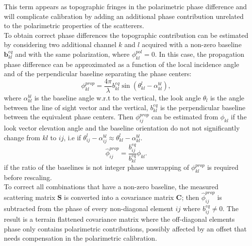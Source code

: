 This term appears as topographic fringes in the polarimetric phase difference and will complicate calibration by adding an additional phase contribution unrelated to the polarimetric properties of the scatterers.\\
To obtain correct phase differences the topographic contribution can be estimated by considering two additional channel $k$ and $l$  acquired with  a non-zero baseline $\mathbf{b}_{kl}^{eq}$ and with the same polarization, where $\phi_{kl}^{pol} = 0$. In this case, the propagation phase difference can be approximated as a function of the local incidence angle and of the perpendicular baseline separating the phase centers:
\begin{equation}\label{eq:prop_approximation}
		\phi_{kl}^{prop} = \frac{4\pi}{\lambda} b_{kl}^{eq} \sin(\theta_{kl}^l - \alpha_{kl}^{bl}),
\end{equation}
where $\alpha_{kl}^{bl}$ is the baseline angle w.r.t to the vertical, the look angle $\theta_l$ is the angle between the line of sight vector and the vertical, $b_{kl}^{eq}$ is the perpendicular baseline between the equivalent phase centers. Then $\phi_{ij}^{prop}$ can be estimated from $\phi_{kl}$ if the look vector elevation angle and the baseline orientation do not not significantly change from $kl$ to $ij$, i.e if $\theta_{ij}^l - \alpha_{ij}^{bl} \approx \theta_{kl}^l - \alpha_{kl}^{bl}$. 
\begin{equation}
	\hat{\phi}_{ij}^{prop} = \frac{b_{ij}^{eq}}{b_{kl}^{eq}} \phi_{kl}.
\end{equation}
if the ratio of the baselines is not integer\cite{Massonnet1996} phase unwrapping of $\phi_{kl}^{prop}$ is required before rescaling.\\
To correct all combinations that have a non-zero baseline, the measured scattering matrix $\mathbf{S}$ is converted into a covariance matrix $\mathbf{C}$; then $\hat{\phi}_{ij}^{prop}$ is subtracted from the phase of every non-diagonal element $ij$ where $b_{ij}^{eq} \neq 0$. The result is a terrain flattened covariance matrix where the off-diagonal elements phase only contains polarimetric contributions, possibly affected by an offset that needs compensation in the polarimetric calibration.\\
